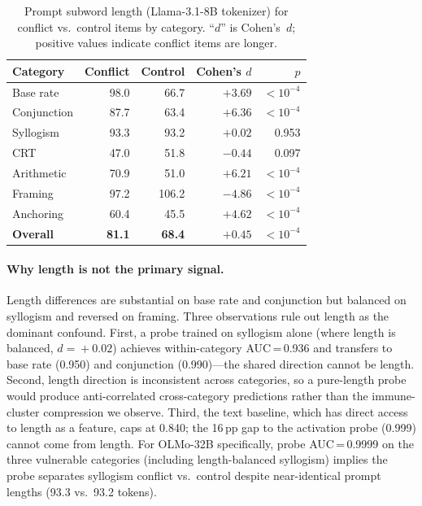 \documentclass{article}
\begin{document}
\begin{table}[ht]
\centering
\caption{Prompt subword length (Llama-3.1-8B tokenizer) for
  conflict vs.\ control items by category.  ``$d$'' is Cohen's~$d$;
  positive values indicate conflict items are longer.}
\label{tab:length_anon}
\vspace{4pt}
\small
\begin{tabular}{lrrrr}
\toprule
\textbf{Category} & \textbf{Conflict} & \textbf{Control} & \textbf{Cohen's $d$} & \textbf{$p$} \\
\midrule
Base rate      & 98.0  & 66.7  & $+3.69$  & $<10^{-4}$ \\
Conjunction    & 87.7  & 63.4  & $+6.36$  & $<10^{-4}$ \\
Syllogism      & 93.3  & 93.2  & $+0.02$  & 0.953 \\
CRT            & 47.0  & 51.8  & $-0.44$  & 0.097 \\
Arithmetic     & 70.9  & 51.0  & $+6.21$  & $<10^{-4}$ \\
Framing        & 97.2  & 106.2 & $-4.86$  & $<10^{-4}$ \\
Anchoring      & 60.4  & 45.5  & $+4.62$  & $<10^{-4}$ \\
\midrule
\textbf{Overall} & \textbf{81.1} & \textbf{68.4} & $+0.45$ & $<10^{-4}$ \\
\bottomrule
\end{tabular}
\end{table}

\paragraph{Why length is not the primary signal.}
Length differences are substantial on base rate and conjunction but
balanced on syllogism and reversed on framing.  Three observations
rule out length as the dominant confound.  First, a probe trained on
syllogism alone (where length is balanced, $d\!=\!+0.02$) achieves
within-category AUC\,=\,0.936 and transfers to base rate (0.950) and
conjunction (0.990)---the shared direction cannot be length.  Second,
length direction is inconsistent across categories, so a pure-length
probe would produce anti-correlated cross-category predictions rather
than the immune-cluster compression we observe.  Third, the text
baseline, which has direct access to length as a feature, caps at
0.840; the 16\,pp gap to the activation probe (0.999) cannot come from
length.  For OLMo-32B specifically, probe AUC\,=\,0.9999 on the
three vulnerable categories (including length-balanced syllogism)
implies the probe separates syllogism conflict vs.\ control despite
near-identical prompt lengths (93.3 vs.\ 93.2 tokens).
\end{document}
